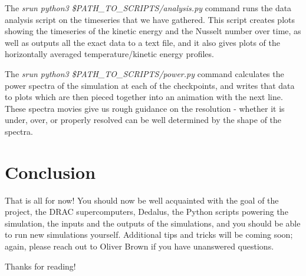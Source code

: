 \documentclass[12pt,a4paper]{report}
\begin{document}
	The \textit{srun python3 \$PATH\_TO\_SCRIPTS/analysis.py} command runs the data analysis script on the timeseries that we have gathered. This script creates plots showing the timeseries of the kinetic energy and the Nusselt number over time, as well as outputs all the exact data to a text file, and it also gives plots of the horizontally averaged temperature/kinetic energy profiles.

	The \textit{srun python3 \$PATH\_TO\_SCRIPTS/power.py} command calculates the power spectra of the simulation at each of the checkpoints, and writes that data to plots which are then pieced together into an animation with the next line. These spectra movies give us rough guidance on the resolution - whether it is under, over, or properly resolved can be well determined by the shape of the spectra.


\chapter{Conclusion}
	That is all for now! You should now be well acquainted with the goal of the project, the DRAC supercomputers, Dedalus, the Python scripts powering the simulation, the inputs and the outputs of the simulations, and you should be able to run new simulations yourself. Additional tips and tricks will be coming soon; again, please reach out to Oliver Brown if you have unanswered questions.

	Thanks for reading!
\end{document}
